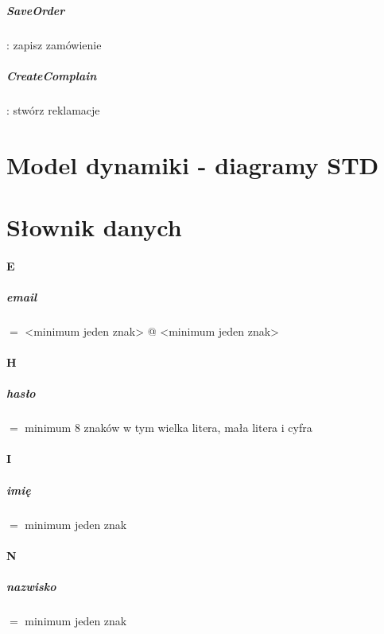 \documentclass[12pt]{report}
\begin{document}
	\paragraph{SaveOrder} : zapisz zamówienie
	
	\paragraph{CreateComplain} : stwórz reklamacje
	\chapter{Model dynamiki - diagramy STD}
	
	\chapter{Słownik danych}
	
	\subsubsection{E}
\paragraph{email} $=$ <minimum jeden znak> @ <minimum jeden znak> 
\subsubsection{H}
\paragraph{hasło} $=$ minimum 8 znaków w tym wielka litera, mała litera i cyfra 
\subsubsection{I}
\paragraph{imię}  $=$ minimum jeden znak  
\subsubsection{N}
\paragraph{nazwisko} $=$ minimum jeden znak 
\end{document}
